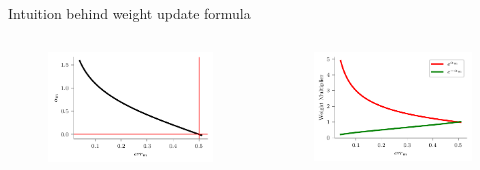 \documentclass{beamer}
\begin{document}


\begin{frame}{Intuition behind weight update formula}
  \begin{columns}
    \pause \begin{column}{0.5\textwidth}
      \begin{figure}
        \centering
        \includegraphics[scale=0.7]{alpha-boosting.pdf}

        \label{fig:alpha-boosting}
      \end{figure}
    \end{column}
    \pause \begin{column}{0.5\textwidth}
      \begin{figure}
        \centering
        \includegraphics[scale=0.7]{alpha-boosting-weight.pdf}

        \label{fig:alpha-boosting}
      \end{figure}
    \end{column}
  \end{columns}


\end{frame}
\end{document}

